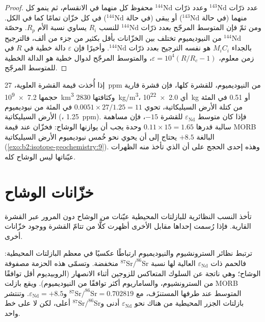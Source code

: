 \begin{proof}
عدد ذرّات $^{143}\mathrm{Nd}$ وعدد ذرّات $^{144}\mathrm{Nd}$
محفوظ كل منهما في الانقسام، ثم ينمو كل منهما (في حالة
$^{143}\mathrm{Nd}$) أو يبقى (في حالة $^{144}\mathrm{Nd}$) في كل خزّان تمامًا كما
في الكل. ومن ثمّ فإن المتوسط المرجّح بعدد ذرّات $^{144}\mathrm{Nd}$ للنسب $R_i$ يساوي
نسبة الأم $R_p$. وحصّة $^{144}\mathrm{Nd}$ من النيوديميوم تختلف
بين الخزّانات بأقل بكثير من جزء من ألف، فالترجيح بالجداء
$M_iC_i$ هو نفسه الترجيح بعدد ذرّات $^{144}\mathrm{Nd}$. وأخيرًا فإن $\varepsilon$
دالة خطية في $R$ في زمن معلوم، $\varepsilon = 10^4(R/R_c - 1)$،
والمتوسط المرجّح لدوال خطية هو الدالة الخطية للمتوسط المرجّح.
\end{proof}

إذا أُخذت قيمة القشرة العلوية، \qty{27}{ppm} من النيوديميوم، للقشرة
كلها، فإن قشرة قارية حجمها \qty{7.2e9}{km^3} وكثافتها \qty{2830}{kg/m^3}، أي
\qty{2.0e22}{kg} أو 0.51 في المئة من كتلة الأرض السيليكاتية، تحوي
$0.0051\times27/1.25 = 11$ في المئة من نيوديميوم الأرض السيليكاتية (، \qty{1.25}{ppm}). فإذا كان متوسط $\varepsilon_{\mathrm{Nd}}$ للقشرة
$-15$، فإن مساهمة سالبة قدرها $0.11\times15 = 1.65$ وحدة يجب أن
يوازنها الوشاح: فخزّان عند قيمة MORB البالغة $+8.5$ يحتاج إلى أن يحوي
نحو خُمس نيوديميوم الأرض السيليكاتية (\cref{exo:b2:isotope-geochemistry:9}). وهذه إحدى
الحجج على أن  الذي تأخذ منه الظهرات عيّناتها ليس الوشاح
كله.

\section{خزّانات الوشاح}

تأخذ النسب النظائرية للبازلتات المحيطية عيّنات من الوشاح دون المرور عبر
القشرة القارية. فإذا رُسمت إحداها مقابل الأخرى أظهرت كلًّا من
تتامّ القشرة  ووجود خزّانات
أخرى.

ترتبط نظائر السترونشيوم والنيوديميوم ارتباطًا عكسيًا في معظم البازلتات المحيطية: فالحمم
ذات $\varepsilon_{\mathrm{Nd}}$ العالية لها نسبة
$^{87}\mathrm{Sr}/^{86}\mathrm{Sr}$ منخفضة. وتسمّى هذه الحزمة مصفوفة الوشاح؛ وهي ناتجة
عن السلوك المتعاكس للزوجين أثناء الانصهار (الروبيديوم أقل
توافقًا من السترونشيوم، والساماريوم أكثر توافقًا من النيوديميوم). ويقع بازلت MORB
المتوسط عند طرفها المستنزَف، مع $^{87}\mathrm{Sr}/^{86}\mathrm{Sr} = 0.702819$
و$\varepsilon_{\mathrm{Nd}} = +8.5$. وتنتشر بازلتات الجزر المحيطية من هناك نحو
$\varepsilon_{\mathrm{Nd}}$ أدنى و$^{87}\mathrm{Sr}/^{86}\mathrm{Sr}$ أعلى، لكن لا
على خط واحد.

